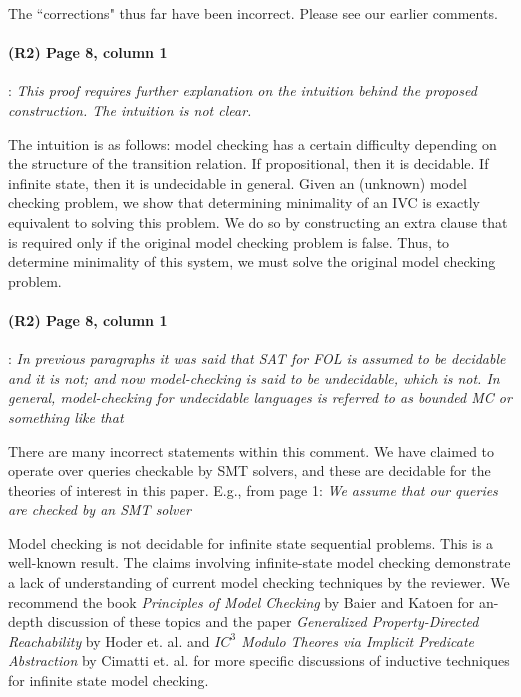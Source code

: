 \documentclass{article}
\begin{document}
\noindent The ``corrections" thus far have been incorrect. Please see our earlier comments.  

\paragraph{(R2) Page 8, column 1}: \textit{This proof requires further explanation on the
intuition behind the proposed construction. The intuition is not clear.}
\vspace{0.05in}

\noindent The intuition is as follows: model checking has a certain difficulty depending on the structure of the transition relation.  If propositional, then it is decidable. If infinite state, then it is undecidable in general.  Given an (unknown) model checking problem, we show that determining minimality of an IVC is exactly equivalent to solving this problem.  We do so by constructing an extra clause that is required only if the original model checking problem is false.  Thus, to determine minimality of this system, we must solve the original model checking problem.


\paragraph{(R2) Page 8, column 1}: \textit{In previous paragraphs it was said that SAT for FOL is assumed to be decidable and it is not; and now model-checking is said to be undecidable, which is not. In general, model-checking for undecidable languages is referred to as bounded MC or something like that}
\vspace{0.05in}

\noindent There are many incorrect statements within this comment.  We have claimed to operate over queries checkable by SMT solvers, and these are decidable for the theories of interest in this paper.  E.g., from page 1: \textit{We assume that our queries are checked by an SMT solver}

Model checking is not decidable for infinite state sequential problems.  This is a well-known result.  The claims involving infinite-state model checking demonstrate a lack of understanding of current model checking techniques by the reviewer.  We recommend the book {\em Principles of Model Checking} by Baier and Katoen for an-depth discussion of these topics and the paper {\em Generalized Property-Directed Reachability} by Hoder et. al.  and {\em $IC^{3}$ Modulo Theores via Implicit Predicate Abstraction} by Cimatti et. al. for more specific discussions of inductive techniques for infinite state model checking.
\end{document}
